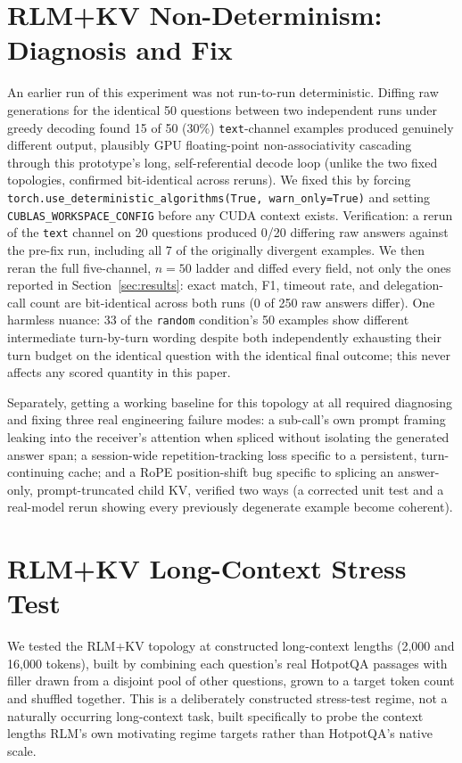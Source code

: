 \documentclass[11pt]{article}
\begin{document}
\section{RLM+KV Non-Determinism: Diagnosis and Fix}
\label{app:nondeterminism}

An earlier run of this experiment was not run-to-run deterministic.
Diffing raw generations for the identical 50 questions between two
independent runs under greedy decoding found 15 of 50 (30\%)
\texttt{text}-channel examples produced genuinely different output,
plausibly GPU floating-point non-associativity cascading through this
prototype's long, self-referential decode loop (unlike the two fixed
topologies, confirmed bit-identical across reruns). We fixed this by
forcing \texttt{torch.use\_deterministic\_algorithms(True,
warn\_only=True)} and setting \texttt{CUBLAS\_WORKSPACE\_CONFIG} before
any CUDA context exists. Verification: a rerun of the \texttt{text}
channel on 20 questions produced 0/20 differing raw answers against the
pre-fix run, including all 7 of the originally divergent examples. We
then reran the full five-channel, $n=50$ ladder and diffed every field,
not only the ones reported in Section~\ref{sec:results}: exact match,
F1, timeout rate, and delegation-call count are bit-identical across
both runs (0 of 250 raw answers differ). One harmless nuance: 33 of the
\texttt{random} condition's 50 examples show different intermediate
turn-by-turn wording despite both independently exhausting their turn
budget on the identical question with the identical final outcome; this
never affects any scored quantity in this paper.

Separately, getting a working baseline for this topology at all
required diagnosing and fixing three real engineering failure modes: a
sub-call's own prompt framing leaking into the receiver's attention
when spliced without isolating the generated answer span; a
session-wide repetition-tracking loss specific to a persistent,
turn-continuing cache; and a RoPE position-shift bug specific to
splicing an answer-only, prompt-truncated child KV, verified two ways
(a corrected unit test and a real-model rerun showing every previously
degenerate example become coherent).

\section{RLM+KV Long-Context Stress Test}
\label{app:longcontext}

We tested the RLM+KV topology at constructed long-context lengths
(2,000 and 16,000 tokens), built by combining each question's real
HotpotQA passages with filler drawn from a disjoint pool of other
questions, grown to a target token count and shuffled together. This
is a deliberately constructed stress-test regime, not a naturally
occurring long-context task, built specifically to probe the context
lengths RLM's own motivating regime targets rather than HotpotQA's
native scale.
\end{document}
